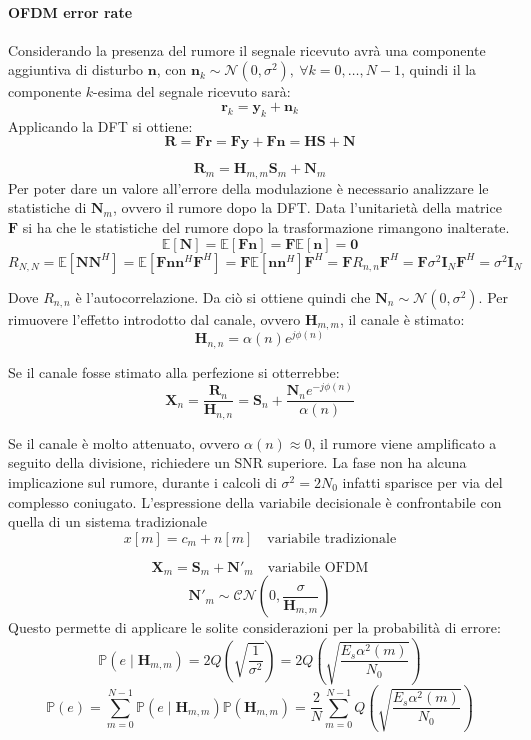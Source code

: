 \paragraph*{OFDM error rate}
Considerando la presenza del rumore il segnale ricevuto avrà una componente aggiuntiva di disturbo $\mathbf{n}$, con $\mathbf{n}_k \sim \mathcal{N}(0, \sigma^2), \ \forall k = 0, \ldots, N-1$, quindi il la componente $k$-esima del segnale ricevuto sarà:
\[
    \mathbf{r}_k = \mathbf{y}_k + \mathbf{n}_k
\]
Applicando la DFT si ottiene:
\[
    \mathbf{R} = \mathbf{F}\mathbf{r} = \mathbf{F}\mathbf{y} + \mathbf{F}\mathbf{n} = \mathbf{H}\mathbf{S} + \mathbf{N}
\]

\[
    \mathbf{R}_{m} = \mathbf{H}_{m, m}\mathbf{S}_{m} + \mathbf{N}_{m}
\]
Per poter dare un valore all'errore della modulazione è necessario analizzare le statistiche di $\mathbf{N}_{m}$, ovvero il rumore dopo la DFT.
Data l'unitarietà della matrice $\mathbf{F}$ si ha che le statistiche del rumore dopo la trasformazione rimangono inalterate.
\[
    \mathbb{E}[\mathbf{N}] = \mathbb{E}[\mathbf{F}\mathbf{n}] = \mathbf{F} \mathbb{E}[\mathbf{n}] = \mathbf{0}
\]  
\[
    R_{N,N} = \mathbb{E}[\mathbf{N}\mathbf{N}^H] = \mathbb{E}[\mathbf{F}\mathbf{n}\mathbf{n}^H\mathbf{F}^H] = \mathbf{F}\mathbb{E}[\mathbf{n}\mathbf{n}^H]\mathbf{F}^H = \mathbf{F}R_{n,n}\mathbf{F}^H = \mathbf{F} \sigma^2 \mathbf{I}_N \mathbf{F}^H = \sigma^2 \mathbf{I}_N
\]

Dove $R_{n,n}$ è l'autocorrelazione. Da ciò si ottiene quindi che $\mathbf{N}_{n} \sim \mathcal{N}(0, \sigma^2)$.
Per rimuovere l'effetto introdotto dal canale, ovvero $\mathbf{H}_{m,m}$, il canale è stimato:
\[
    \mathbf{H}_{n, n}= \alpha(n) e^{j\phi(n)}
\]

Se il canale fosse stimato alla perfezione si otterrebbe:
\[
    \mathbf{X}_{n} = \frac{\mathbf{R}_{n}}{\mathbf{H}_{n, n}} = \mathbf{S}_{n} + \frac{\mathbf{N}_{n} e^{-j\phi(n)}}{\alpha(n)}
\]


Se il canale è molto attenuato, ovvero $\alpha(n) \approx 0$, il rumore viene amplificato a seguito della divisione, richiedere un SNR superiore.
La fase non ha alcuna implicazione sul rumore, durante i calcoli di $\sigma ^2=2N_0$ infatti sparisce per via del complesso coniugato.
L'espressione della variabile decisionale è confrontabile con quella di un sistema tradizionale
\[
    x[m] = c_m + n[m] \quad \text{variabile tradizionale}
\]

\[
    \mathbf{X}_{m} = \mathbf{S}_{m} + \mathbf{N}'_{m} \quad \text{variabile OFDM}
\]
\[
    \mathbf{N}'_{m} \sim \mathcal{CN}(0, \frac{\sigma}{\mathbf{H}_{m, m}})
\]
Questo permette di applicare le solite considerazioni per la probabilità di errore:
\[
    \mathbb{P}(e \mid \mathbf{H}_{m, m}) = 2 Q\left( \sqrt{\frac{1}{\sigma^2}}  \right) = 2 Q\left( \sqrt{\frac{E_s \alpha^2(m)}{N_0}}  \right) 
\]
\[
    \mathbb{P}(e) = \sum_{m=0}^{N-1} \mathbb{P}(e \mid \mathbf{H}_{m, m}) \mathbb{P}(\mathbf{H}_{m,m}) = \frac{2}{N} \sum_{m=0}^{N-1} Q\left( \sqrt{\frac{E_s \alpha^2(m)}{N_0}}  \right)
\]

